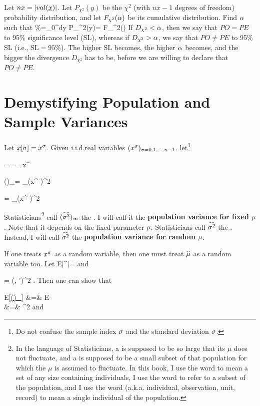 Let $nx=|val(\rvx)|$.
Let $P_{\chi^2}(y)$
be the $\chi^2$
(with $nx-1$ degrees of freedom)
probability
distribution,
and let $F_{\chi^2}(\alpha)$
be its cumulative
distribution.
Find $\alpha$
such that
\%=\int_{0}^{\alp}dy\; P_{\chi^2}(y)=
F_{\chi^2}(\alp)
\eeq
If $D_{\chi^2}<\alpha$,
then we say that $PO=PE$ to 95\%
significance level (SL),
whereas if
$D_{\chi^2}>\alpha$,
we say that $PO\neq PE$
to 95\% SL (i.e., SL$=95\%$).
The higher SL becomes,
the higher $\alpha$ becomes,
and the bigger the
divergence $D_{\chi^2}$
has to be,
before we are
willing to declare that $PO\neq PE$.

\section{Demystifying Population
and Sample Variances}
Let $x[\sigma]=x^\sigma$.
Given  i.i.d.real  variables
$(x^\sigma)_{\sigma=0,1, \ldots, n-1}$,
let\footnote{Do not confuse the sample
index $\sigma$ and the standard deviation
$\sigma$.}

\beq
\HAT{\mu}==
\sum_\s x^\s
\;
\eeq

\beq
(\hatvar)_\infty=
\sum_\s (x^\s-\mu)^2
\eeq

\beq
\hatvar=
\sum_\s (x^\s-\HAT{\mu})^2
\eeq

Statisticians\footnote{
In the language of Statisticians,
 a 
is supposed to be
so large that its $\mu$
does not fluctuate,
and a  is
supposed to be a small
subset of that population
for which the $\mu$
is assumed to fluctuate.
In this book, I
use the word 
to mean a set of any size
containing individuals, I use
the word 
to refer to a subset
of the population,
and I use the
word 
(a.k.a. individual, observation, unit,
record)  to mean a
single individual
of the population.} call
$(\widehat{\sigma^2})_\infty$ the
. I will
call it the {\bf population
variance for fixed $\mu$}.
Note that it depends
on
the fixed parameter $\mu$.
Statisticians   call
$\widehat{\sigma^2}$ the
.
Instead,
 I will
call $\widehat{\sigma^2}$ the {\bf
population
variance for random $\mu$}.

If one treats $x^\sigma$ as a random
variable, then one must treat
${\widehat{\mu}}$
as a random variable too.
Let
\beq
E[\rvx^\s]=\mu
\eeq
and

\beq
{}=
\delta(\s, \s')\s^2
\;.
\eeq
Then one can show that

\beqa
E[\ul{(\hatvar)_\infty}]
&=&
E\left[
\sum_\s (\rvx^\s-\mu)^2
\right]
\\
&=&
\s^2
\eeqa
and


